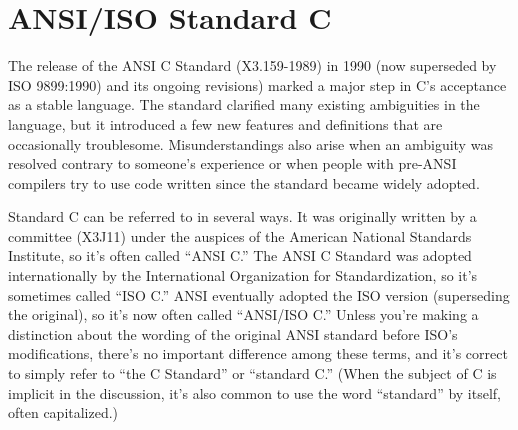 \chapter{ANSI/ISO Standard C}	\label{chap:standard}

The release of the ANSI C Standard (X3.159-1989) in 1990 (now superseded by
ISO 9899:1990) and its ongoing revisions) marked a major step in C's
acceptance as a stable language.  The standard clarified many existing
ambiguities in the language, but it introduced a few new features and
definitions that are occasionally troublesome.  Misunderstandings also arise
when an ambiguity was resolved contrary to someone's experience or when people
with pre-ANSI compilers try to use code written since the standard became
widely adopted.

Standard C can be referred to in several ways. It was originally written by
a committee (X3J11) under the auspices of the American National Standards
Institute, so it's often called ``ANSI C.''  The ANSI C Standard was adopted
internationally by the International Organization for Standardization, so it's
sometimes called ``ISO C.''  ANSI eventually adopted the ISO version
(superseding the original), so it's now often called ``ANSI/ISO C.''
Unless you're making a distinction about the wording of the original ANSI
standard before ISO's modifications, there's no important difference among
these terms, and it's correct to simply refer to ``the C Standard'' or
``standard C.'' (When the subject of C is implicit in the discussion, it's
also common to use the word ``standard'' by itself, often capitalized.)

